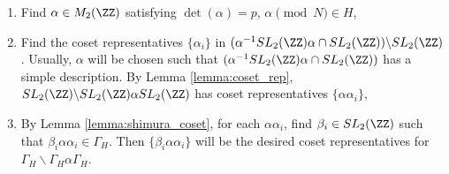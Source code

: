 \begin{enumerate}
    \item Find $\alpha \in M_2(\ZZ)$ satisfying $\det(\alpha) = p$, $\alpha \pmod{N} \in H$,
    \item Find the coset representatives $\{\alpha_i\}$ in $(\alpha^{-1} SL_2(\ZZ) \alpha \cap  SL_2(\ZZ))\backslash SL_2(\ZZ)$. Usually, $\alpha$ will be chosen such that $(\alpha^{-1} SL_2(\ZZ) \alpha \cap  SL_2(\ZZ))$ has a simple description. By Lemma \ref{lemma:coset_rep}, $SL_2(\ZZ)\backslash SL_2(\ZZ) \alpha SL_2(\ZZ)$ has coset representatives $\{\alpha \alpha_i\}$,
    \item By Lemma \ref{lemma:shimura_coset}, for each $\alpha \alpha_i$, find $\beta_i \in SL_2(\ZZ)$ such that $\beta_i \alpha \alpha_i \in \Gamma_H$. Then $\{ \beta_i \alpha \alpha_i\}$ will be the desired coset representatives for $\Gamma_H \backslash \Gamma_H \alpha \Gamma_H$.
\end{enumerate}

